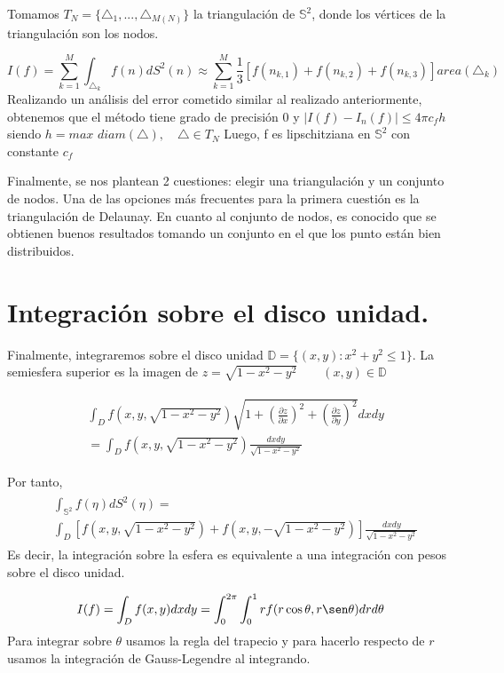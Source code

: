 \medskip
Tomamos $T_N=\{\triangle_1,...,\triangle_{M(N)}\}$ la triangulación de $\mathds{S}^2$, donde los vértices de la triangulación son los nodos.

$$
I(f) = \sum_{k=1}^{M} \int_{\triangle_k} f(n)dS^2(n) \approx  \sum_{k=1}^{M} \frac{1}{3}[f(n_{k,1})+f(n_{k,2})+f(n_{k,3})] area(\triangle_k)
$$
Realizando un análisis del error cometido similar al realizado anteriormente, obtenemos que el método tiene grado de precisión 0 y 
$|I(f)-I_n(f)|\le 4\pi c_f h$ siendo $h=max$ $diam(\triangle), \quad \triangle\in T_N$
Luego, f es lipschitziana en $\mathds{S}^2$ con constante $ c_f$

Finalmente, se nos plantean 2 cuestiones: elegir una triangulación y un conjunto de nodos. Una de las opciones más frecuentes para la primera cuestión es la triangulación de Delaunay. En cuanto al conjunto de nodos, es conocido que se obtienen buenos resultados tomando un conjunto en el que los punto están bien distribuidos.

\section{Integración sobre el disco unidad.}
Finalmente, integraremos sobre el disco unidad $\mathds{D}=\{(x,y):x^2+y^2 \le 1\}.$
La semiesfera superior es la imagen de 
$z=\sqrt{1-x^2-y^2} \qquad (x,y)\in \mathds{D}$

\begin{gather*}
\begin{aligned}
&\int_{D}f(x,y,\sqrt{1-x^2-y^2})\sqrt{1+(\frac{\partial z}{\partial x})^2+(\frac{\partial z}{\partial y})^2} dx dy \\ 
&= \int_D f(x,y,\sqrt{1-x^2-y^2})\frac{dx dy}{\sqrt{1-x^2-y^2}}
\end{aligned}
\end{gather*}
	
Por tanto,
\begin{gather*}
\begin{aligned}
&\int_{\mathds{S}^2}f(\eta) dS^2(\eta)  =\\ &\int_D \left[f(x,y,\sqrt{1-x^2-y^2})+f(x,y,-\sqrt{1-x^2-y^2})\right]\frac{dx dy}{\sqrt{1-x^2-y^2}}
\end{aligned}
\end{gather*}  
Es decir, la integración sobre la esfera es equivalente a una integración con pesos sobre el disco unidad.


$$I(f)=\int_{D} f(x,y) dxdy = \int_{0}^{2\pi}\int_{0}^{1} rf(r\cos\theta,r\sen\theta)drd\theta $$
Para integrar sobre $\theta$ usamos la regla del trapecio y para hacerlo respecto de $r$ usamos la integración de Gauss-Legendre al integrando.

